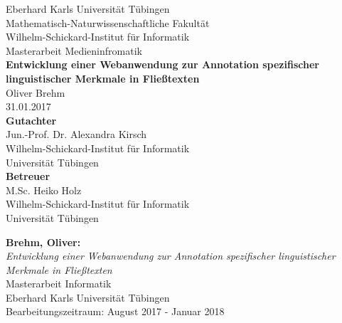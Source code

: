 \documentclass[twoside,12pt,a4paper]{scrreprt}
\begin{document}
\begin{titlepage}
\begin{center}
\LARGE Eberhard Karls Universität Tübingen\\
\large Mathematisch-Naturwissenschaftliche Fakultät \\
Wilhelm-Schickard-Institut für Informatik\\
[3cm]
\huge Masterarbeit Medieninfromatik\\
[2cm]
\Large\textbf{Entwicklung einer Webanwendung zur Annotation spezifischer linguistischer Merkmale in Fließtexten}\\
[1.5cm]
\large Oliver Brehm\\
[0.5cm]
31.01.2017\\
\vfill
\small\textbf{Gutachter}\\[0.3cm]
\large Jun.-Prof. Dr. Alexandra Kirsch\\
\footnotesize Wilhelm-Schickard-Institut für Informatik\\Universität Tübingen\\
[1cm]
\small\textbf{Betreuer}\\[0.3cm]
\large M.Sc. Heiko Holz\\
\footnotesize Wilhelm-Schickard-Institut für Informatik\\Universität Tübingen
\end{center}
\end{titlepage}

\thispagestyle{empty}
\vspace*{\fill}
\textbf{Brehm, Oliver:}\\
\emph{Entwicklung einer Webanwendung zur Annotation spezifischer linguistischer Merkmale in Fließtexten}\\
Masterarbeit Informatik\\
Eberhard Karls Universität Tübingen\\
Bearbeitungszeitraum: August 2017 - Januar 2018
\newpage


\newpage

\tableofcontents\label{toc}
\cleardoublepage


\cleardoublepage
\end{document}
